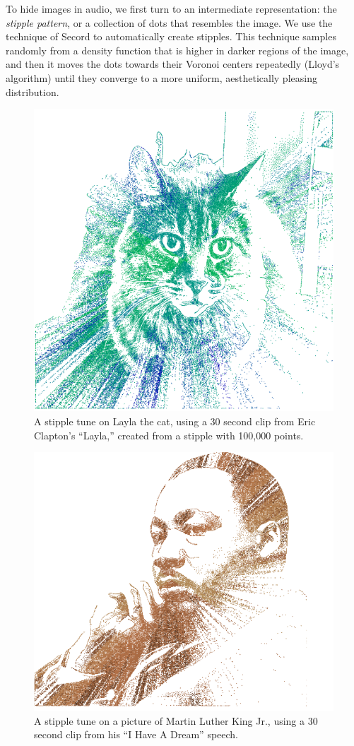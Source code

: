 \documentclass{article}
\begin{document}
To hide images in audio, we first turn to an intermediate representation: the {\em stipple pattern}, or a collection of dots that resembles the image.  We use the technique of Secord \cite{secord2002weighted} to automatically create stipples.  This technique samples randomly from a density function that is higher in darker regions of the image, and then it moves the dots towards their Voronoi centers repeatedly (Lloyd's algorithm) until they converge to a more uniform, aesthetically pleasing distribution.

\begin{figure}
  \centering
  \includegraphics[width=0.8\columnwidth]{laylaViterbiStipple.png}
  \caption{A stipple tune on Layla the cat, using a 30 second clip from Eric Clapton's ``Layla,'' created from a stipple with 100,000 points.}
  \label{fig:laylaViterbiStipple}
\end{figure}

\begin{figure}
  \centering
  \includegraphics[width=0.8\columnwidth]{mlkViterbiStipple.png}
  \caption{A stipple tune on a picture of Martin Luther King Jr., using a 30 second clip from his ``I Have A Dream'' speech.}
  \label{fig:mlkViterbiStipple}
\end{figure}
\end{document}
